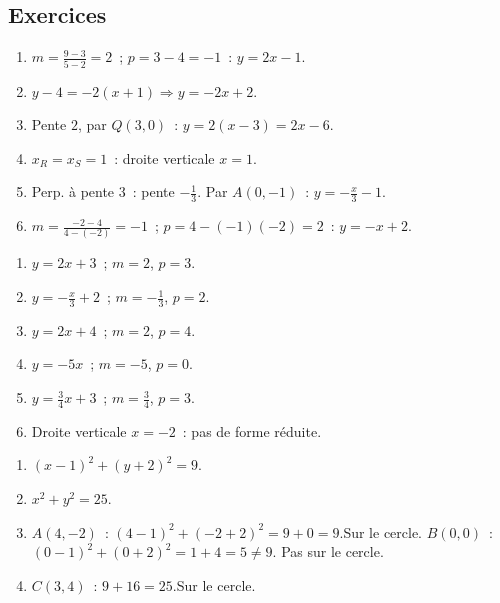 
\subsection*{Exercices}


\begin{enumerate}
  \item $m=\frac{9-3}{5-2}=2$~; $p=3-4=-1$~: $y=2x-1$.
  \item $y-4=-2(x+1)\Rightarrow y=-2x+2$.
  \item Pente $2$, par $Q(3,0)$~: $y=2(x-3)=2x-6$.
  \item $x_R=x_S=1$~: droite verticale $x=1$.
  \item Perp. \`a pente $3$~: pente $-\frac{1}{3}$. Par $A(0,-1)$~: $y=-\frac{x}{3}-1$.
  \item $m=\frac{-2-4}{4-(-2)}=-1$~; $p=4-(-1)(-2)=2$~: $y=-x+2$.
\end{enumerate}


\begin{enumerate}
  \item $y=2x+3$~; $m=2$, $p=3$.
  \item $y=-\frac{x}{3}+2$~; $m=-\frac{1}{3}$, $p=2$.
  \item $y=2x+4$~; $m=2$, $p=4$.
  \item $y=-5x$~; $m=-5$, $p=0$.
  \item $y=\frac{3}{4}x+3$~; $m=\frac{3}{4}$, $p=3$.
  \item Droite verticale $x=-2$~: pas de forme r\'eduite.
\end{enumerate}


\begin{enumerate}
  \item $(x-1)^2+(y+2)^2=9$.
  \item $x^2+y^2=25$.
  \item $A(4,-2)$~: $(4-1)^2+(-2+2)^2=9+0=9$.\checkmark\quad Sur le cercle.
        $B(0,0)$~: $(0-1)^2+(0+2)^2=1+4=5\ne9$. Pas sur le cercle.
  \item $C(3,4)$~: $9+16=25$.\checkmark\quad Sur le cercle.
\end{enumerate}

